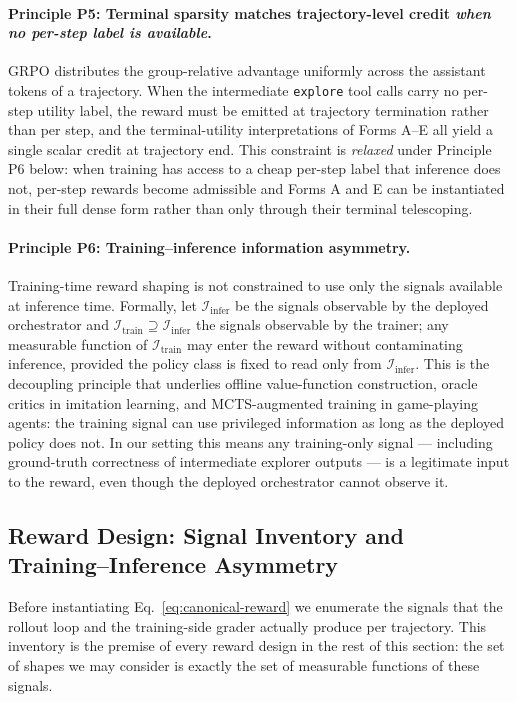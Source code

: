 \paragraph{Principle P5: Terminal sparsity matches trajectory-level credit \emph{when no per-step label is available}.}
GRPO distributes the group-relative advantage uniformly across the assistant tokens of a trajectory. When the intermediate \texttt{explore} tool calls carry no per-step utility label, the reward must be emitted at trajectory termination rather than per step, and the terminal-utility interpretations of Forms A--E all yield a single scalar credit at trajectory end. This constraint is \emph{relaxed} under Principle P6 below: when training has access to a cheap per-step label that inference does not, per-step rewards become admissible and Forms A and E can be instantiated in their full dense form rather than only through their terminal telescoping.

\paragraph{Principle P6: Training--inference information asymmetry.}
Training-time reward shaping is not constrained to use only the signals available at inference time. Formally, let $\mathcal{I}_{\mathrm{infer}}$ be the signals observable by the deployed orchestrator and $\mathcal{I}_{\mathrm{train}} \supseteq \mathcal{I}_{\mathrm{infer}}$ the signals observable by the trainer; any measurable function of $\mathcal{I}_{\mathrm{train}}$ may enter the reward without contaminating inference, provided the policy class is fixed to read only from $\mathcal{I}_{\mathrm{infer}}$. This is the decoupling principle that underlies offline value-function construction, oracle critics in imitation learning, and MCTS-augmented training in game-playing agents: the training signal can use privileged information as long as the deployed policy does not. In our setting this means any training-only signal --- including ground-truth correctness of intermediate explorer outputs --- is a legitimate input to the reward, even though the deployed orchestrator cannot observe it.

\subsection{Reward Design: Signal Inventory and Training--Inference Asymmetry}
\label{app:training-reward-signals}

Before instantiating Eq.~\eqref{eq:canonical-reward} we enumerate the signals that the rollout loop and the training-side grader actually produce per trajectory. This inventory is the premise of every reward design in the rest of this section: the set of shapes we may consider is exactly the set of measurable functions of these signals.

